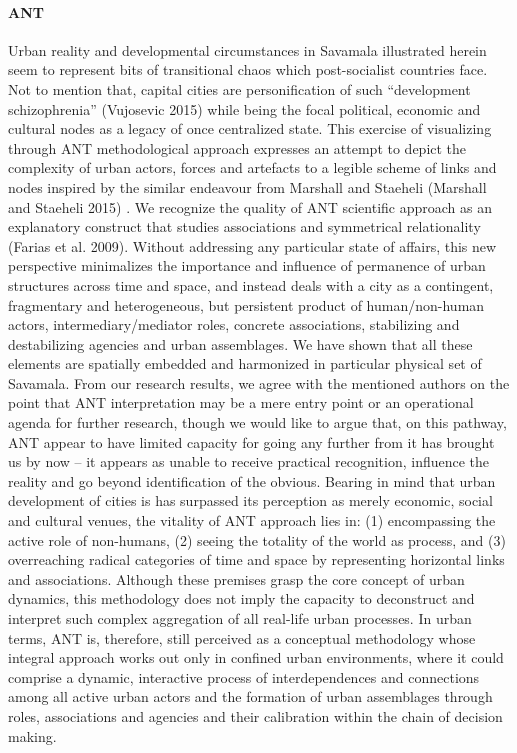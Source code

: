\documentclass[11pt]{report}
\begin{document}
\paragraph{ANT}
 
Urban reality and developmental circumstances in Savamala illustrated herein seem to represent bits of transitional chaos which post-socialist countries face. Not to mention that, capital cities are personification of such “development schizophrenia” (Vujosevic 2015) while being the focal political, economic and cultural nodes as a legacy of once centralized state. This exercise of visualizing through ANT methodological approach expresses an attempt to depict the complexity of urban actors, forces and artefacts to a legible scheme of links and nodes inspired by the similar endeavour from Marshall and Staeheli (Marshall and Staeheli 2015) . We recognize the quality of ANT scientific approach as an explanatory construct that studies associations and symmetrical relationality (Farias et al. 2009). Without addressing any particular state of affairs, this new perspective minimalizes the importance and influence of permanence of urban structures across time and space, and instead deals with a city as a contingent, fragmentary and heterogeneous, but persistent product of human/non-human actors, intermediary/mediator roles, concrete associations, stabilizing and destabilizing agencies and urban assemblages. We have shown that all these elements are spatially embedded and harmonized in particular physical set of Savamala. From our research results, we agree with the mentioned authors on the point that ANT interpretation may be a mere entry point or an operational agenda for further research, though we would like to argue that, on this pathway, ANT appear to have limited capacity for going any further from it has brought us by now – it appears as unable to receive practical recognition, influence the reality and go beyond identification of the obvious.
Bearing in mind that urban development of cities is has surpassed its perception as merely economic, social and cultural venues, the vitality of ANT approach lies in: (1) encompassing the active role of non-humans, (2) seeing the totality of the world as process, and (3) overreaching radical categories of time and space by representing horizontal links and associations. Although these premises grasp the core concept of urban dynamics, this methodology does not imply the capacity to deconstruct and interpret such complex aggregation of all real-life urban processes. In urban terms, ANT is, therefore, still perceived as a conceptual methodology whose integral approach works out only in confined urban environments, where it could comprise a dynamic, interactive process of interdependences and connections among all active urban actors and the formation of urban assemblages through roles, associations and agencies and their calibration within the chain of decision making.
\end{document}
